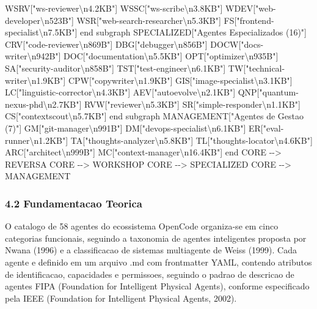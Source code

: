 \documentclass[
  12pt,
]{article}
\newenvironment{Shaded}{}{}
\newcommand{\NormalTok}[1]{#1}
\begin{document}
\begin{Shaded}
\begin{Highlighting}[]
\NormalTok{WSRV["ws{-}reviewer\textbackslash{}n4.2KB"]}
\NormalTok{WSSC["ws{-}scribe\textbackslash{}n3.8KB"]}
\NormalTok{WDEV["web{-}developer\textbackslash{}n523B"]}
\NormalTok{WSR["web{-}search{-}researcher\textbackslash{}n5.3KB"]}
\NormalTok{FS["frontend{-}specialist\textbackslash{}n7.5KB"]}
\NormalTok{end}
\NormalTok{subgraph SPECIALIZED["Agentes Especializados (16)"]}
\NormalTok{CRV["code{-}reviewer\textbackslash{}n869B"]}
\NormalTok{DBG["debugger\textbackslash{}n856B"]}
\NormalTok{DOCW["docs{-}writer\textbackslash{}n942B"]}
\NormalTok{DOC["documentation\textbackslash{}n5.5KB"]}
\NormalTok{OPT["optimizer\textbackslash{}n935B"]}
\NormalTok{SA["security{-}auditor\textbackslash{}n858B"]}
\NormalTok{TST["test{-}engineer\textbackslash{}n6.1KB"]}
\NormalTok{TW["technical{-}writer\textbackslash{}n1.9KB"]}
\NormalTok{CPW["copywriter\textbackslash{}n1.9KB"]}
\NormalTok{GIS["image{-}specialist\textbackslash{}n3.1KB"]}
\NormalTok{LC["linguistic{-}corrector\textbackslash{}n4.3KB"]}
\NormalTok{AEV["autoevolve\textbackslash{}n2.1KB"]}
\NormalTok{QNP["quantum{-}nexus{-}phd\textbackslash{}n2.7KB"]}
\NormalTok{RVW["reviewer\textbackslash{}n5.3KB"]}
\NormalTok{SR["simple{-}responder\textbackslash{}n1.1KB"]}
\NormalTok{CS["contextscout\textbackslash{}n5.7KB"]}
\NormalTok{end}
\NormalTok{subgraph MANAGEMENT["Agentes de Gestao (7)"]}
\NormalTok{GM["git{-}manager\textbackslash{}n991B"]}
\NormalTok{DM["devops{-}specialist\textbackslash{}n6.1KB"]}
\NormalTok{ER["eval{-}runner\textbackslash{}n1.2KB"]}
\NormalTok{TA["thoughts{-}analyzer\textbackslash{}n5.8KB"]}
\NormalTok{TL["thoughts{-}locator\textbackslash{}n4.6KB"]}
\NormalTok{ARC["architect\textbackslash{}n999B"]}
\NormalTok{MC["context{-}manager\textbackslash{}n16.4KB"]}
\NormalTok{end}
\NormalTok{CORE {-}{-}\textgreater{} REVERSA}
\NormalTok{CORE {-}{-}\textgreater{} WORKSHOP}
\NormalTok{CORE {-}{-}\textgreater{} SPECIALIZED}
\NormalTok{CORE {-}{-}\textgreater{} MANAGEMENT}
\end{Highlighting}
\end{Shaded}

\subsubsection{4.2 Fundamentacao Teorica}\label{fundamentacao-teorica-3}

O catalogo de 58 agentes do ecossistema OpenCode organiza-se em cinco
categorias funcionais, seguindo a taxonomia de agentes inteligentes
proposta por Nwana (1996) e a classificacao de sistemas multiagente de
Weiss (1999). Cada agente e definido em um arquivo .md com frontmatter
YAML, contendo atributos de identificacao, capacidades e permissoes,
seguindo o padrao de descricao de agentes FIPA (Foundation for
Intelligent Physical Agents), conforme especificado pela IEEE
(Foundation for Intelligent Physical Agents, 2002).
\end{document}
